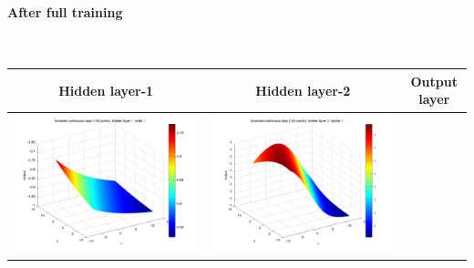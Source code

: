 \documentclass[fleqn]{article}
\newcommand{\myparagraph}[1]{\paragraph{#1}\mbox{}\\}
\begin{document}
\myparagraph{After full training}
\begin{center}
  \begin{longtable}{ c | c | r }
	\multicolumn{1}{c}{Hidden layer-1 } & 
	\multicolumn{1}{c}{Hidden layer-2 } & 
	\multicolumn{1}{c}{Output layer} \\
    \hline
    \includegraphics[scale=0.25]{./pics/bivariate100/_2_4/_2_4_epoch_Inf_hidden layer 1 :1}  &  \includegraphics[scale=0.25]{./pics/bivariate100/_2_4/_2_4_epoch_Inf_hidden layer 2 :21} &  \\ 

\end{longtable}
\end{center}
\end{document}
